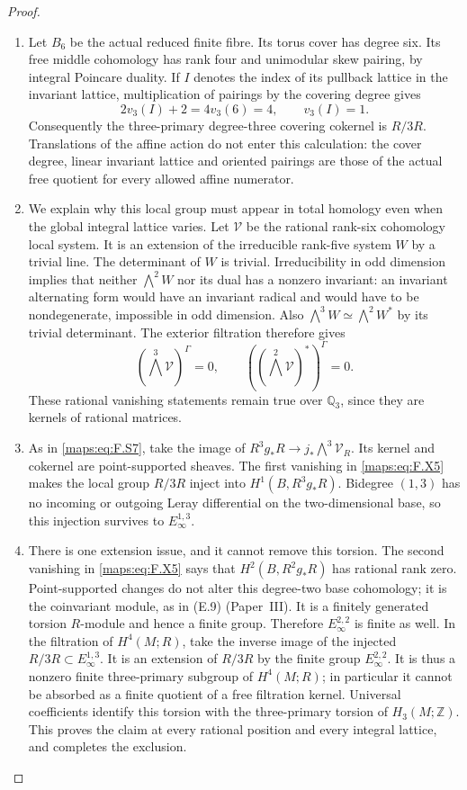 \documentclass[11pt,a4paper]{article}
\theoremstyle{definition}
\newcommand{\ExternalPaperRef}[3]{\ifmmode\text{\upshape #1#2 (Paper~#3)}\else #1#2 (Paper~#3)\fi}
\begin{document}
\begin{proof}
\begin{enumerate}[label=\arabic*.]
\item Let $B_6$ be the actual reduced finite fibre.  Its torus
cover has degree six.  Its free middle cohomology has
rank four and unimodular skew pairing, by integral
Poincare duality.  If $I$ denotes the index of its
pullback lattice in the invariant lattice, multiplication
of pairings by the covering degree gives
\[
 2v_3(I)+2=4v_3(6)=4,
 \qquad v_3(I)=1.
 \tag{F.X4}\label{maps:eq:F.X4}
\]
Consequently the three-primary degree-three covering
cokernel is $R/3R$.  Translations of the affine action
do not enter this calculation: the cover degree,
linear invariant lattice and oriented pairings are
those of the actual free quotient for every allowed
affine numerator.

\item We explain why this local group must appear in total
homology even when the global integral lattice varies.
Let $\mathcal V$ be the rational rank-six cohomology
local system.  It is an extension of the irreducible
rank-five system $W$ by a trivial line.  The determinant
of $W$ is trivial.  Irreducibility in odd dimension
implies that neither $\bigwedge^2 W$ nor its dual
has a nonzero invariant: an invariant alternating
form would have an invariant radical and would have
to be nondegenerate, impossible in odd dimension.
Also $\bigwedge^3W\simeq\bigwedge^2W^*$ by its
trivial determinant.  The exterior filtration therefore
gives
\[
 (\bigwedge^3\mathcal V)^\Gamma=0,\qquad
 ((\bigwedge^2\mathcal V)^*)^\Gamma=0.
 \tag{F.X5}\label{maps:eq:F.X5}
\]
These rational vanishing statements remain true over
$\mathbb Q_3$, since they are kernels of rational
matrices.

\item As in \eqref{maps:eq:F.S7}, take the image of
$R^3g_*R\to j_*\bigwedge^3\mathcal V_R$.
Its kernel and cokernel are point-supported sheaves.
The first vanishing in \eqref{maps:eq:F.X5} makes the local group
$R/3R$ inject into $H^1(B,R^3g_*R)$.  Bidegree $(1,3)$
has no incoming or outgoing Leray differential on
the two-dimensional base, so this injection survives
to $E_\infty^{1,3}$.

\item There is one extension issue, and it cannot remove
this torsion.  The second vanishing in \eqref{maps:eq:F.X5} says
that $H^2(B,R^2g_*R)$ has rational rank zero.
Point-supported changes do not alter this degree-two
base cohomology; it is the coinvariant module, as
in \ExternalPaperRef{}{({E.9})}{III}.  It is a finitely generated torsion $R$-module
and hence a finite group.  Therefore
$E_\infty^{2,2}$ is finite as well.  In the filtration
of $H^4(M;R)$, take the inverse image of the injected
$R/3R\subset E_\infty^{1,3}$.  It is an extension
of $R/3R$ by the finite group $E_\infty^{2,2}$.
It is thus a nonzero finite three-primary subgroup
of $H^4(M;R)$; in particular it cannot be absorbed
as a finite quotient of a free filtration kernel.
Universal coefficients identify this torsion with
the three-primary torsion of $H_3(M;\mathbb Z)$.
This proves the claim at every rational position and
every integral lattice, and completes the exclusion.


\end{enumerate}
\end{proof}
\end{document}
